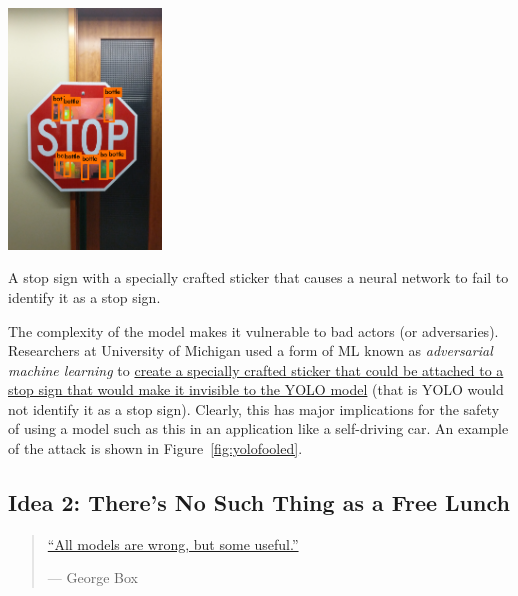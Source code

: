 \documentclass[assignment01_Solutions]{subfiles}
\begin{document}
\begin{marginfigure}
\includegraphics[width=1.6in]{figures/yolofooled}
\caption{A stop sign with a specially crafted sticker that causes a neural network to fail to identify it as a stop sign.}\label{fig:yolofooled}
\end{marginfigure}
The complexity of the model makes it vulnerable to bad actors (or adversaries).  Researchers at University of Michigan used a form of ML known as \emph{adversarial machine learning} to \href{https://iotsecurity.engin.umich.edu/physical-adversarial-examples-for-object-detectors/}{create a specially crafted sticker that could be attached to a stop sign that would make it invisible to the YOLO model} (that is YOLO would not identify it as a stop sign).  Clearly, this has major implications for the safety of using a model such as this in an application like a self-driving car.   An example of the attack is shown in Figure~\ref{fig:yolofooled}.

\ei

\subsection*{Idea 2: There's No Such Thing as a Free Lunch}

\begin{quotation}
\href{https://en.wikipedia.org/wiki/All_models_are_wrong}{``All models are wrong, but some useful.''}

--- George Box
\end{quotation}
\end{document}
